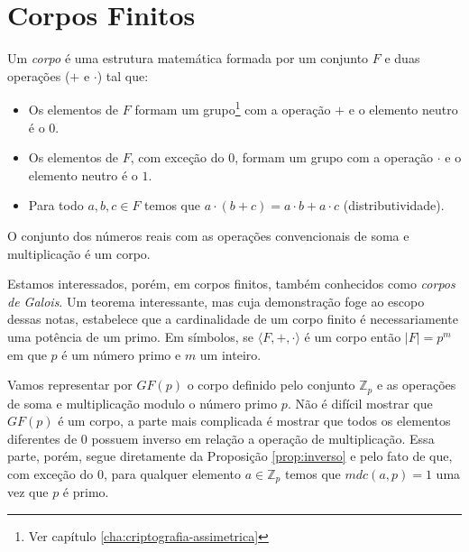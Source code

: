 \chapter{Corpos Finitos}
\label{cha:corpos-finitos}

Um {\em corpo} é uma estrutura matemática formada por um conjunto $F$ e duas operações ($+$ e $\cdot$) tal que:
\begin{itemize}
\item Os elementos de $F$ formam um grupo\footnote{Ver capítulo \ref{cha:criptografia-assimetrica}} com a operação $+$ e o elemento neutro é o $0$.
\item Os elementos de $F$, com exceção do $0$, formam um grupo com a operação $\cdot$ e o elemento neutro é o $1$.
\item Para todo $a, b, c \in F$ temos que $a \cdot(b + c) = a \cdot b + a \cdot c$ (distributividade).
\end{itemize}
 
O conjunto dos números reais com as operações convencionais de soma e multiplicação é um corpo.

Estamos interessados, porém, em corpos finitos, também conhecidos como {\em corpos de Galois}.
Um teorema interessante, mas cuja demonstração foge ao escopo dessas notas, estabelece que a cardinalidade de um corpo finito é necessariamente uma potência de um primo.
Em símbolos, se $\langle F, +, \cdot \rangle$ é um corpo então $|F| = p^m$ em que $p$ é um número primo e $m$ um inteiro.

Vamos representar por $GF(p)$ o corpo definido pelo conjunto $\mathbb{Z}_p$ e as operações de soma e multiplicação modulo o número primo $p$.
Não é difícil mostrar que $GF(p)$ é um corpo, a parte mais complicada é mostrar que todos os elementos diferentes de $0$ possuem inverso em relação a operação de multiplicação.
Essa parte, porém, segue diretamente da Proposição \ref{prop:inverso} e pelo fato de que, com exceção do $0$, para qualquer elemento $a \in \mathbb{Z}_p$ temos que $mdc(a,p) = 1$ uma vez que $p$ é primo.

